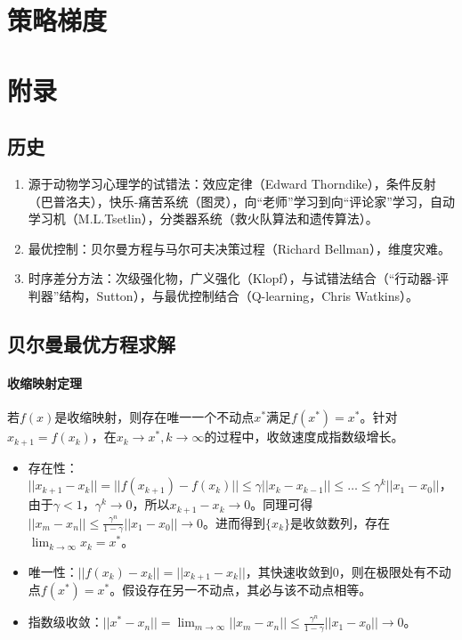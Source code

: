\documentclass[
12pt, %
a4paper, 
oneside, %
headinclude,footinclude, %
]{scrartcl}
\begin{document}
\section{策略梯度}
\section{附录}
\subsection{历史}
\begin{enumerate}
\item 源于动物学习心理学的试错法：效应定律（Edward Thorndike），条件反射（巴普洛夫），快乐-痛苦系统（图灵），向“老师”学习到向“评论家”学习，自动学习机（M.L.Tsetlin），分类器系统（救火队算法和遗传算法）。
\item 最优控制：贝尔曼方程与马尔可夫决策过程（Richard Bellman），维度灾难。
\item 时序差分方法：次级强化物，广义强化（Klopf），与试错法结合（“行动器-评判器”结构，Sutton），与最优控制结合（Q-learning，Chris Watkins）。
\end{enumerate}
\subsection{贝尔曼最优方程求解}\label{sec:Scalability Mapping}
\paragraph{收缩映射定理}
若$ f(x) $是收缩映射，则存在唯一一个不动点$ x^* $满足$ f(x^*) = x^* $。针对$ x_{k + 1} = f(x_k) $，在$ x_k \to x^*, k \to \infty $的过程中，收敛速度成指数级增长。
\begin{itemize}
\item 存在性：$ ||x_{k + 1} - x_k|| = ||f(x_{k + 1}) - f(x_k)|| \leq \gamma||x_k - x_{k - 1}|| \leq \dots \leq \gamma^k||x_1 - x_0|| $，由于$ \gamma < 1 $，$ \gamma^k \to 0 $，所以$ x_{k + 1} - x_k \to 0 $。同理可得$ ||x_m - x_n|| \leq \frac{\gamma^n}{1 - \gamma}||x_1 - x_0|| \to 0 $。进而得到$ \{x_k\} $是收敛数列，存在$ \lim_{k \to \infty} x_k = x^* $。
\item 唯一性：$ ||f(x_k) - x_k|| = ||x_{k + 1} - x_k||$，其快速收敛到$ 0 $，则在极限处有不动点$ f(x^*) = x^* $。假设存在另一不动点，其必与该不动点相等。
\item 指数级收敛：$ ||x^* - x_n|| = \lim_{m \to \infty}||x_m - x_n|| \leq \frac{\gamma^n}{1 - \gamma}||x_1 - x_0|| \to 0 $。
\end{itemize}
\end{document}
